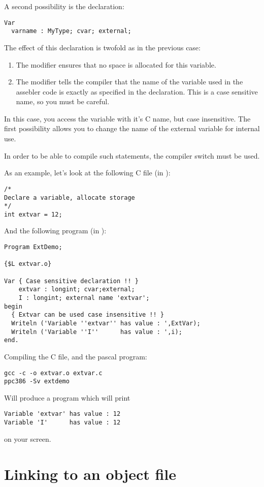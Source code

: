 \documentclass{report}
\begin{document}
A second possibility is the declaration:
\begin{verbatim}
Var
  varname : MyType; cvar; external;
\end{verbatim}
The effect of this declaration is twofold as in the previous case:
\begin{enumerate}
\item The  modifier ensures that no space is allocated for
this variable.
\item The  modifier tells the compiler that the name of the
variable used in the assebler code is exactly as specified in the
declaration. This is a case sensitive name, so you must be careful.
\end{enumerate}
In this case, you access the variable with it's C name, but case
insensitive. The first possibility allows you to change the name of the
external variable for  internal use.

In order to be able to compile such statements, the compiler switch 
must be used.

As an example, let's look at the following C file (in ):
\begin{verbatim}
/*
Declare a variable, allocate storage
*/
int extvar = 12;
\end{verbatim}
And the following program (in ):
\begin{verbatim}
Program ExtDemo;

{$L extvar.o}

Var { Case sensitive declaration !! }
    extvar : longint; cvar;external;
    I : longint; external name 'extvar';
begin
  { Extvar can be used case insensitive !! }
  Writeln ('Variable ''extvar'' has value : ',ExtVar);
  Writeln ('Variable ''I''      has value : ',i);
end.
\end{verbatim}
Compiling the C file, and the pascal program:
\begin{verbatim}
gcc -c -o extvar.o extvar.c
ppc386 -Sv extdemo
\end{verbatim}
Will produce a program  which will print
\begin{verbatim}
Variable 'extvar' has value : 12
Variable 'I'      has value : 12
\end{verbatim}
on your screen.

\section{Linking to an object file}
\label{se:LinkIn}
\end{document}
